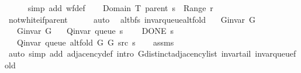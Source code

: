 \begin{isabellebody}
\ \ \ \ \isamarkupfalse%
\ {\isacharparenleft}{\kern0pt}simp\ add{\isacharcolon}{\kern0pt}\ wf{\isacharunderscore}{\kern0pt}def{\isacharparenright}{\kern0pt}\isanewline
\ \ \isamarkupfalse%
\ {\isachardoublequoteopen}Domain\ {\isacharparenleft}{\kern0pt}T\ {\isacharparenleft}{\kern0pt}parent\ s{\isacharparenright}{\kern0pt}{\isacharparenright}{\kern0pt}\ {\isasyminter}\ Range\ {\isacharquery}{\kern0pt}r\ {\isacharequal}{\kern0pt}\ {\isacharbraceleft}{\kern0pt}{\isacharbraceright}{\kern0pt}{\isachardoublequoteclose}\isanewline
\ \ \ \ \isamarkupfalse%
\ not{\isacharunderscore}{\kern0pt}white{\isacharunderscore}{\kern0pt}if{\isacharunderscore}{\kern0pt}parent\isanewline
\ \ \ \ \isamarkupfalse%
\ auto\isanewline
{}\isamarkupfalse%
%
\endisatagproof
{\isafoldproof}%
%
\isadelimproof
\isanewline
%
\endisadelimproof
%
\isadeliminvisible
\isanewline
%
\endisadeliminvisible
%
\isataginvisible
{}\isamarkupfalse%
\ {\isacharparenleft}{\kern0pt}\ alt{\isacharunderscore}{\kern0pt}bfs{\isacharparenright}{\kern0pt}\ invar{\isacharunderscore}{\kern0pt}queue{\isacharunderscore}{\kern0pt}alt{\isacharunderscore}{\kern0pt}fold{\isacharcolon}{\kern0pt}\isanewline
\ \ \ {\isachardoublequoteopen}G{\isachardot}{\kern0pt}invar\ G{}{\isachardoublequoteclose}\isanewline
\ \ \ {\isachardoublequoteopen}G{\isachardot}{\kern0pt}invar\ G{}{\isachardoublequoteclose}\isanewline
\ \ \ {\isachardoublequoteopen}Q{\isacharunderscore}{\kern0pt}invar\ {\isacharparenleft}{\kern0pt}queue\ s{\isacharparenright}{\kern0pt}{\isachardoublequoteclose}\isanewline
\ \ \ {\isachardoublequoteopen}{\isasymnot}\ DONE\ s{\isachardoublequoteclose}\isanewline
\ \ \ {\isachardoublequoteopen}Q{\isacharunderscore}{\kern0pt}invar\ {\isacharparenleft}{\kern0pt}queue\ {\isacharparenleft}{\kern0pt}alt{\isacharunderscore}{\kern0pt}fold\ G{}\ G{}\ src\ s{\isacharparenright}{\kern0pt}{\isacharparenright}{\kern0pt}{\isachardoublequoteclose}%
\endisataginvisible
{\isafoldinvisible}%
%
\isadeliminvisible
\isanewline
%
\endisadeliminvisible
%
\isadelimproof
\ \ %
\endisadelimproof
%
\isatagproof
{}\isamarkupfalse%
\ assms\isanewline
\ \ \isamarkupfalse%
\ {\isacharparenleft}{\kern0pt}auto\ simp\ add{\isacharcolon}{\kern0pt}\ adjacency{\isacharunderscore}{\kern0pt}def\ intro{\isacharcolon}{\kern0pt}\ G{\isachardot}{\kern0pt}distinct{\isacharunderscore}{\kern0pt}adjacency{\isacharunderscore}{\kern0pt}list\ invar{\isacharunderscore}{\kern0pt}tail\ invar{\isacharunderscore}{\kern0pt}queue{\isacharunderscore}{\kern0pt}fold{\isacharparenright}{\kern0pt}%

\end{isabellebody}
